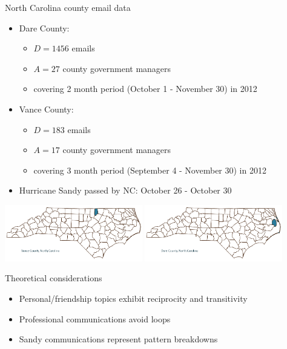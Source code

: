 \documentclass[10pt]{beamer}
\def\bni{\begin{itemize}} \def\ei{\end{itemize}}
\theoremstyle{definition}
\theoremstyle{remark}
\begin{document}
\begin{frame}{North Carolina county email data}
 \bni \item Dare County: 
 \begin{itemize}
 \item $D = 1456$ emails
\item  $A = 27$ county government managers
\item  covering 2 month period (October 1 - November 30) in 2012
 \end{itemize}
 \item Vance County:
  \begin{itemize}
 \item $D = 183$ emails
\item  $A = 17$ county government managers
\item  covering 3 month period (September 4 - November 30) in 2012
 \end{itemize}
 \item Hurricane Sandy passed by NC: October 26 - October 30
 \ei
 
 \centering
  	\includegraphics[width=0.45\textwidth]{figures/Vance.png} 
  	     	\includegraphics[width=0.45\textwidth]{figures/Dare.png}
\end{frame}


\begin{frame}{Theoretical considerations}
\large
\begin{itemize}
\item Personal/friendship topics exhibit reciprocity and transitivity \vspace{.4cm}
\item Professional communications avoid loops  \vspace{.4cm}
\item Sandy communications represent pattern breakdowns
\end{itemize}

\end{frame}
\end{document}
